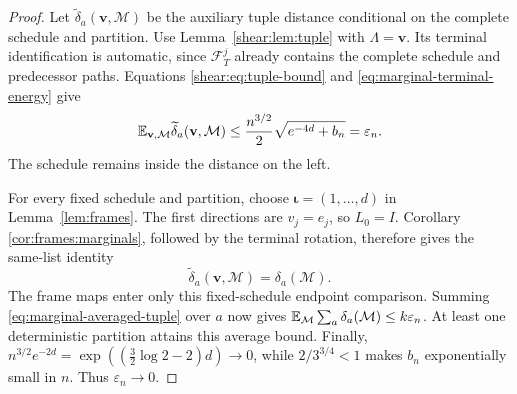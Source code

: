 \begin{proof}
Let $\widetilde\delta_a(\mathbf v,\mathcal M)$ be the auxiliary
tuple distance conditional on the complete schedule and partition.
Use Lemma~\ref{shear:lem:tuple} with $\Lambda=\mathbf v$.
Its terminal identification is automatic, since
$\mathcal F_T^j$ already contains the complete schedule and
predecessor paths. Equations
\eqref{shear:eq:tuple-bound} and
\eqref{eq:marginal-terminal-energy} give
\begin{equation}\label{eq:marginal-averaged-tuple}
 \mathbb E_{\mathbf v,\mathcal M}
 \widetilde\delta_a(\mathbf v,\mathcal M)
 \le\frac{n^{3/2}}2\sqrt{e^{-4d}+b_n}
 =\varepsilon_n.
\end{equation}
The schedule remains inside the distance on the left.

For every fixed schedule and partition, choose
$\boldsymbol\iota=(1,\ldots,d)$ in Lemma~\ref{lem:frames}.
The first directions are $v_j=e_j$, so $L_0=I$. Corollary
\ref{cor:frames:marginals}, followed by the terminal rotation,
therefore gives the same-list identity
\begin{equation}\label{eq:marginal-frame-transfer}
 \widetilde\delta_a(\mathbf v,\mathcal M)=\delta_a(\mathcal M).
\end{equation}
The frame maps enter only this fixed-schedule endpoint comparison.
Summing \eqref{eq:marginal-averaged-tuple} over $a$ now gives
$\mathbb E_{\mathcal M}\sum_a\delta_a(\mathcal M)\le k\varepsilon_n$.
At least one deterministic partition attains this average bound.
Finally,
$n^{3/2}e^{-2d}=\exp((\tfrac32\log2-2)d)\to0$, while
$2/3^{3/4}<1$ makes $b_n$ exponentially small in $n$.
Thus $\varepsilon_n\to0$.
\end{proof}
